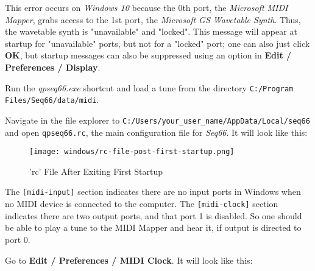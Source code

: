    This error occurs on \textsl{Windows 10} because the 0th port, the
   \textsl{Microsoft MIDI Mapper}, grabs access to the 1st port, the
   \textsl{Microsoft GS Wavetable Synth}.
   Thus, the wavetable synth is "unavailable" and "locked".
   This message will appear at startup for "unavailable" ports,
   but not for a "locked" port; one can also just click
   \textbf{OK}, but startup messages can also be suppressed using an option in
   \textbf{Edit / Preferences / Display}.


   Run the \textsl{qpseq66.exe} shortcut and load a tune from the
   directory \texttt{C:/Program Files/Seq66/data/midi}.


   Navigate in the file explorer to
   \texttt{C:/Users/your\_user\_name/AppData/Local/seq66} and open
   \texttt{qpseq66.rc}, the main configuration file for \textsl{Seq66}.
   It will look like this:

\begin{figure}[H]
   \centering 
   \texttt{[image: windows/rc-file-post-first-startup.png]}
   \caption{'rc' File After Exiting First Startup}
   \label{fig:windows_rc_file_post_first_startup}
\end{figure}

   The \texttt{[midi-input]} section indicates there are no input ports
   in Windows when no MIDI device is connected to the computer.
   The \texttt{[midi-clock]} section indicates there are two output
   ports, and that port 1 is disabled.   So one should be able to
   play a tune to the MIDI Mapper and hear it, if output is directed
   to port 0.


   Go to \textbf{Edit / Preferences / MIDI Clock}.
   It will look like this:

